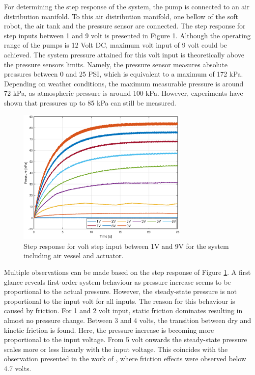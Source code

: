 For determining the step response of the system, the pump is connected to an air distribution manifold. To this air distribution manifold, one bellow of the soft robot, the air tank and the pressure sensor are connected. The step response for step inputs between 1 and 9 volt is presented in Figure \ref{fig3:pump_dynamics_adapted}. Although the operating range of the pumps is 12 Volt DC, maximum volt input of 9 volt could be achieved. The system pressure attained for this volt input is theoretically above the pressure sensors limits. Namely, the pressure sensor measures absolute pressures between 0 and 25 PSI, which is equivalent to a maximum of 172 kPa. Depending on weather conditions, the maximum measurable pressure is around 72 kPa, as atmospheric pressure is around 100 kPa. However, experiments have shown that pressures up to 85 kPa can still be measured.  

\begin{figure}[H]
    \centering
    \includegraphics[width = 0.75\textwidth]{Figures/Chapter3/stepnewairtankbellow.eps}
    \caption{Step response for volt step input between 1V and 9V for the system including air vessel and actuator.}
    \label{fig3:pump_dynamics_adapted}
\end{figure}


Multiple observations can be made based on the step response of Figure \ref{fig3:pump_dynamics_adapted}. A first glance reveals first-order system behaviour as pressure increase seems to be proportional to the actual pressure. However, the steady-state pressure is not proportional to the input volt for all inputs. The reason for this behaviour is caused by friction. For 1 and 2 volt input, static friction dominates resulting in almost no pressure change. Between 3 and 4 volts, the transition between dry and kinetic friction is found. Here, the pressure increase is becoming more proportional to the input voltage. From 5 volt onwards the steady-state pressure scales more or less linearly with the input voltage. This coincides with the observation presented in the work of \cite{berkers}, where friction effects were observed below 4.7 volts.

